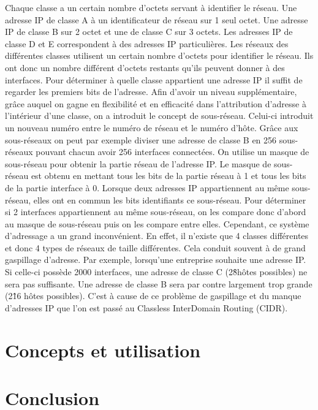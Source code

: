 \documentclass[twoside,openright,a4paper,11pt,french]{article}
\begin{document}
Chaque classe a un certain nombre d'octets servant à identifier le réseau. Une
adresse IP de classe A à un identificateur de réseau sur 1 seul octet. Une
adresse IP de classe B sur 2 octet et une de classe C sur 3 octets. Les
adresses IP de classe D et E correspondent à des adresses IP particulières.
Les réseaux des différentes classes utilisent un certain nombre d'octets pour
identifier le réseau. Ils ont donc un nombre différent d'octets restants qu'ils
peuvent donner à des interfaces.  Pour déterminer à quelle classe appartient
une adresse IP il suffit de regarder les premiers bits de l'adresse.  Afin
d'avoir un niveau supplémentaire, grâce auquel on gagne en flexibilité et en
efficacité dans l'attribution d'adresse à l'intérieur d'une classe, on a
introduit le concept de sous-réseau. Celui-ci introduit un nouveau numéro entre
le numéro de réseau et le numéro d'hôte. Grâce aux sous-réseaux on peut par
exemple diviser une adresse de classe B en 256 sous-réseaux pouvant chacun
avoir 256 interfaces connectées.  On utilise un masque de sous-réseau pour
obtenir la partie réseau de l'adresse IP. Le masque de sous-réseau est obtenu
en mettant tous les bits de la partie réseau à 1 et tous les bits de la partie
interface à 0. Lorsque deux adresses IP appartiennent au même sous-réseau,
elles ont en commun les bits identifiants ce sous-réseau. Pour déterminer si 2
interfaces appartiennent au même sous-réseau, on les compare donc d'abord au
masque de sous-réseau puis on les compare entre elles.
Cependant, ce système d'adressage a un grand inconvénient. En effet, il
n'existe que 4 classes différentes et donc 4 types de réseaux de taille
différentes. Cela conduit souvent à de grand gaspillage d'adresse. Par exemple,
lorsqu'une entreprise souhaite une adresse IP. Si celle-ci possède 2000
interfaces, une adresse de classe C (2\^8hôtes possibles) ne sera pas
suffisante. Une adresse de classe B sera par contre largement trop grande (2\^16
hôtes possibles). C'est à cause de ce problème de gaspillage et du manque
d'adresses IP que l'on est passé au Classless InterDomain Routing (CIDR).



\section{Concepts et utilisation}












\section{Conclusion}




\end{document}
